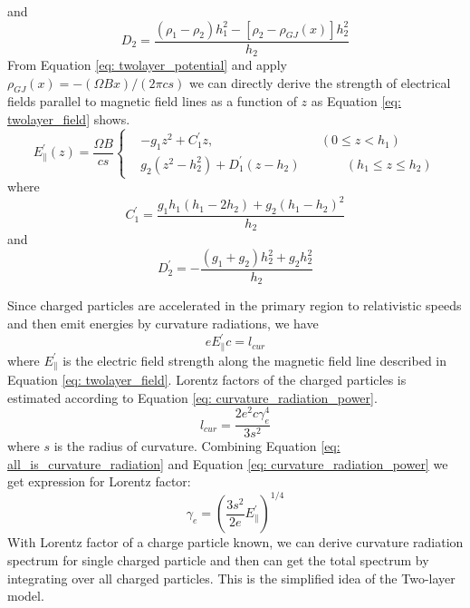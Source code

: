 \documentclass[12pt]{report}
\begin{document}
    and 
    \begin{equation*}
      D_{2} = \frac{\left(\rho_1-\rho_2\right)h_1^2-\left[\rho_2-\rho_{GJ}\left(x\right)\right]h_2^2}{h_2}
    \end{equation*}
    From Equation \ref{eq: twolayer_potential} and apply 
    $\rho_{GJ}\left(x\right)=-\left(\Omega B x\right)/\left(2\pi cs\right)$ 
    we can directly derive the strength of electrical fields parallel to magnetic field lines as a 
    function of $z$ as Equation \ref{eq: twolayer_field} shows.
    \begin{equation}
      \label{eq: twolayer_field}
        E^{\prime}_{\parallel}\left(z\right) = \frac{\Omega B}{cs}
        \left\{\begin{alignedat}{2}
          & -g_1 z^2 + C_1^{\prime}z ,  &&\left(0 \leq z < h_{1}\right) \\
          & g_2\left(z^2 - h_2^2\right) + D_1^{\prime}\left(z-h_2\right)  &&\qquad \left(h_{1} \leq z \leq h_{2}\right) 
        \end{alignedat}\right.
    \end{equation}
    where 
    \begin{equation*}
      C_{1}^{\prime} = \frac{g_1 h_1 \left(h_1 - 2h_2\right)+ g_2\left(h_1-h_2\right)^2}{h_2}  
    \end{equation*}
    and 
    \begin{equation*}
      D_{2}^{\prime} = -\frac{\left(g_1 + g_2\right)h_2^2 + g_2 h_2^2}{h_2}
    \end{equation*}

    Since charged particles are accelerated in the primary region to relativistic speeds 
    and then emit energies by curvature radiations, we have
    \begin{equation}
      \label{eq: all_is_curvature_radiation}
      e E_{\parallel}^{\prime} c = l_{cur}
    \end{equation}
    where $E_\parallel^{\prime}$ is the electric field strength along the magnetic field 
    line described in Equation \ref{eq: twolayer_field}.
    Lorentz factors of the charged particles is estimated according to Equation 
    \ref{eq: curvature_radiation_power}.
    \begin{equation}
      \label{eq: curvature_radiation_power}
      l_{cur} = \frac{2 e^2 c \gamma^{4}_{e}}{3s^2}
    \end{equation}      
    where $s$ is the radius of curvature. 
    Combining Equation \ref{eq: all_is_curvature_radiation} and Equation
    \ref{eq: curvature_radiation_power} we get expression for Lorentz factor: 
    \begin{equation}
      \label{eq: gamma_can_be_zero}
      \gamma_{e} = \left(\frac{3s^2}{2e} E_{\parallel}^{\prime}\right)^{1/4}
    \end{equation}
    With Lorentz factor of a charge particle known, we can derive curvature radiation 
    spectrum for single charged particle and then can get the total spectrum by integrating 
    over all charged particles. This is the simplified idea of the Two-layer model. 
  
\end{document}
